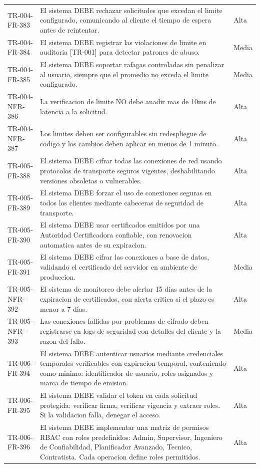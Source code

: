 \begin{longtable}{>{\raggedright\arraybackslash}p{} >{\raggedright\arraybackslash}p{} >{\raggedright\arraybackslash}p{}}
TR-004-FR-383 & El sistema DEBE rechazar solicitudes que excedan el limite configurado, comunicando al cliente el tiempo de espera antes de reintentar. & Alta \\
TR-004-FR-384 & El sistema DEBE registrar las violaciones de limite en auditoria [TR-001] para detectar patrones de abuso. & Media \\
TR-004-FR-385 & El sistema DEBE soportar rafagas controladas sin penalizar al usuario, siempre que el promedio no exceda el limite configurado. & Media \\
TR-004-NFR-386 & La verificacion de limite NO debe anadir mas de 10ms de latencia a la solicitud. & Alta \\
TR-004-NFR-387 & Los limites deben ser configurables sin redespliegue de codigo y los cambios deben aplicar en menos de 1 minuto. & Alta \\
TR-005-FR-388 & El sistema DEBE cifrar todas las conexiones de red usando protocolos de transporte seguros vigentes, deshabilitando versiones obsoletas o vulnerables. & Alta \\
TR-005-FR-389 & El sistema DEBE forzar el uso de conexiones seguras en todos los clientes mediante cabeceras de seguridad de transporte. & Alta \\
TR-005-FR-390 & El sistema DEBE usar certificados emitidos por una Autoridad Certificadora confiable, con renovacion automatica antes de su expiracion. & Alta \\
TR-005-FR-391 & El sistema DEBE cifrar las conexiones a base de datos, validando el certificado del servidor en ambiente de produccion. & Media \\
TR-005-NFR-392 & El sistema de monitoreo debe alertar 15 dias antes de la expiracion de certificados, con alerta critica si el plazo es menor a 7 dias. & Alta \\
TR-005-NFR-393 & Las conexiones fallidas por problemas de cifrado deben registrarse en logs de seguridad con detalles del cliente y la razon del fallo. & Media \\
TR-006-FR-394 & El sistema DEBE autenticar usuarios mediante credenciales temporales verificables con expiracion temporal, conteniendo como minimo: identificador de usuario, roles asignados y marca de tiempo de emision. & Alta \\
TR-006-FR-395 & El sistema DEBE validar el token en cada solicitud protegida: verificar firma, verificar vigencia y extraer roles. Si la validacion falla, denegar el acceso. & Alta \\
TR-006-FR-396 & El sistema DEBE implementar una matriz de permisos RBAC con roles predefinidos: Admin, Supervisor, Ingeniero de Confiabilidad, Planificador Avanzado, Tecnico, Contratista. Cada operacion define roles permitidos. & Alta \\

\end{longtable}

